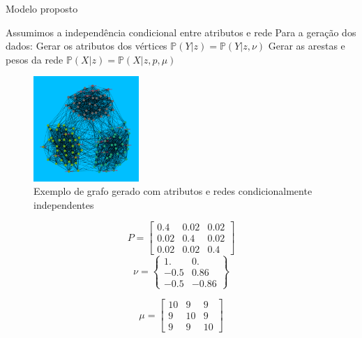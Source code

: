 \documentclass[aspectratio=169]{beamer}
\begin{document}
\begin{frame}{Modelo proposto}
    \begin{outline}
    	\1 Assumimos a independência condicional entre atributos e rede
    	\1 Para a geração dos dados:
    		\2 Gerar os atributos dos vértices $\mathbb{P}\left( Y | z \right) = \mathbb{P}\left( Y | z, \nu \right)$
    		\2 Gerar as arestas e pesos da rede $\mathbb{P}\left( X | z \right) = \mathbb{P}\left( X | z, p, \mu \right)$
      
    \end{outline}
    \begin{minipage}[t]{.35\columnwidth}
    	\begin{figure}
			\includegraphics[scale=0.08,valign=t,width = 4cm]{img/network_example.png}
			\caption{Exemplo de grafo gerado com atributos e redes condicionalmente independentes}
		\end{figure}
    				
    \end{minipage}
	\begin{minipage}[t]{.35\columnwidth}
	
\[
		P =
		\begin{bmatrix}
			0.4 & 0.02 &  0.02\\
			0.02 & 0.4 & 0.02 \\
			0.02 & 0.02 & 0.4
		\end{bmatrix}
		\]
\[
		\nu = 
		\begin{Bmatrix}
			1. & 0.\\
			-0.5 & 0.86\\
			-0.5 & -0.86
		\end{Bmatrix}
\]

    \end{minipage}
    	\begin{minipage}[t]{.25\columnwidth}
    		\[
    		\mu =
    		\begin{bmatrix}
    			10 & 9 &  9\\
    			9 & 10 & 9 \\
    			9 & 9 & 10
    		\end{bmatrix}
    		\]
    	\end{minipage}
\end{frame}
\end{document}
